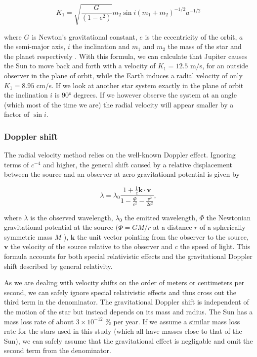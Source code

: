 \begin{equation}
    K_{1}=\sqrt{\frac{G}{\left(1-e^{2}\right)}} m_{2} \sin i\left(m_{1}+m_{2}\right)^{-1 / 2} a^{-1 / 2}
    \label{eq:rv_K}
\end{equation}

where $G$ is Newton's gravitational constant, $e$ is the eccentricity of the orbit, $a$ the semi-major axis, $i$ the inclination and $m_1$ and  $m_2$ the mass of the star and the planet respectively \cite{radial_velocity_techniques}. With this formula, we can calculate that Jupiter causes the Sun to move back and forth with a velocity of $K_1 = 12.5$ m/s, for an outside observer in the plane of orbit, while the Earth induces a radial velocity of only $K_1 = 8.95$ cm/s. If we look at another star system exactly in the plane of orbit the inclination $i$ is 90° degrees. If we however observe the system at an angle (which most of the time we are) the radial velocity will appear smaller by a factor of $\sin{i}$.

\subsubsection{Doppler shift}
The radial velocity method relies on the well-known Doppler effect. Ignoring terms of $c^{-4}$ and higher, the general shift caused by a relative displacement between the source and an observer at zero gravitational potential is given by 

\begin{equation}
    \label{eq:doppler_GR_SR}
    \lambda=\lambda_{0} \frac{1+\frac{1}{c} \mathbf{k} \cdot \mathbf{v}}{1-\frac{\Phi}{c^{2}}-\frac{v^{2}}{2 c^{2}}},
\end{equation}

where $\lambda$ is the observed wavelength, $\lambda_0$ the emitted wavelength, $\Phi$ the Newtonian gravitational potential at the source $(\Phi=G M / r$ at a distance $r$ of a spherically symmetric mass $M$ ), $\textbf{k}$ the unit vector pointing from the observer to the source, $\textbf{v}$ the velocity of the source relative to the observer and $c$ the speed of light. This formula accounts for both special relativistic effects and the gravitational Doppler shift described by general relativity\cite{doppler_shift_GR_formula}.
 
As we are dealing with velocity shifts on the order of meters or centimeters per second, we can safely ignore special relativistic effects and thus cross out the third term in the denominator. The gravitational Doppler shift is independent of the motion of the star but instead depends on its mass and radius. The Sun has a mass loss rate of about $3 \times 10^{-12}$ \% per year\cite{carroll2017introduction}. If we assume a similar mass loss rate for the stars used in this study (which all have masses close to that of the Sun), we can safely assume that the gravitational effect is negligable and omit the second term from the denominator.

